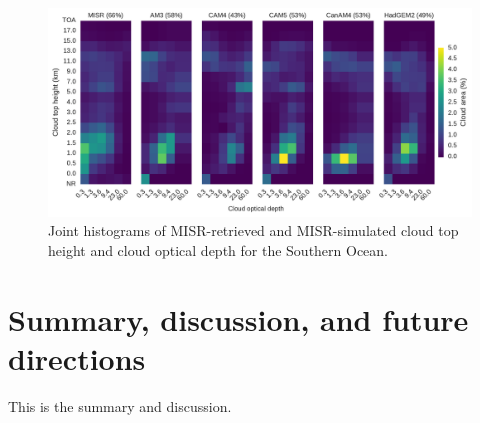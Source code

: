 \begin{figure}[htbp]
\centering
\includegraphics{graphics/cmip5_clMISR_SouthernOcean.pdf}
\caption{\label{fig:cmip5_clMISR_SouthernOcean}Joint histograms of
MISR-retrieved and MISR-simulated cloud top height and cloud optical
depth for the Southern
Ocean.}\label{fig:cmip5ux5fclMISRux5fSouthernOcean}
\end{figure}

\section{Summary, discussion, and future
directions}\label{summary-discussion-and-future-directions}

This is the summary and discussion.
